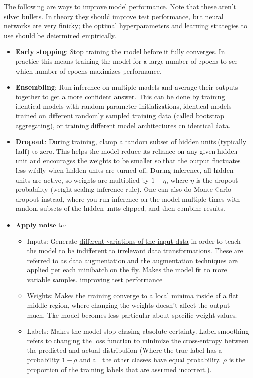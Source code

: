 \documentclass{article}
\begin{document}
The following are ways to improve model performance. Note that these aren't silver bullets. In theory they should improve test performance, but neural networks are very finicky; the optimal hyperparameters and learning strategies to use should be determined empirically.
\begin{itemize}
  \item \textbf{Early stopping}: Stop training the model before it fully converges. In practice this means training the model for a large number of epochs to see which number of epochs maximizes performance.
  \item \textbf{Ensembling}: Run inference on multiple models and average their outputs together to get a more confident answer. This can be done by training identical models with random parameter initializations, identical models trained on different randomly sampled training data (called bootstrap aggregating), or training different model architectures on identical data.
  \item \textbf{Dropout}: During training, clamp a random subset of hidden units (typically half) to zero. This helps the model reduce its reliance on any given hidden unit and encourages the weights to be smaller so that the output fluctuates less wildly when hidden units are turned off. During inference, all hidden units are active, so weights are multiplied by $1 - \eta$, where $\eta$ is the dropout probability (weight scaling inference rule). One can also do Monte Carlo dropout instead, where you run inference on the model multiple times with random subsets of the hidden units clipped, and then combine results.
  \item \textbf{Apply noise} to:
  \begin{itemize}
    \item Inputs: Generate \href{https://arxiv.org/html/2502.18691v1}{different variations of the input data} in order to teach the model to be indifferent to irrelevant data transformations. These are referred to as data augmentation and the augmentation techniques are applied per each minibatch on the fly. Makes the model fit to more variable samples, improving test performance.
    \item Weights: Makes the training converge to a local minima inside of a flat middle region, where changing the weights doesn't affect the output much. The model becomes less particular about specific weight values.
    \item Labels: Makes the model stop chasing absolute certainty. Label smoothing refers to changing the loss function to minimize the cross-entropy between the predicted and actual distribution (Where the true label has a probability $1-\rho$ and all the other classes have equal probability. $\rho$ is the proportion of the training labels that are assumed incorrect.).

\end{itemize}
\end{itemize}
\end{document}
